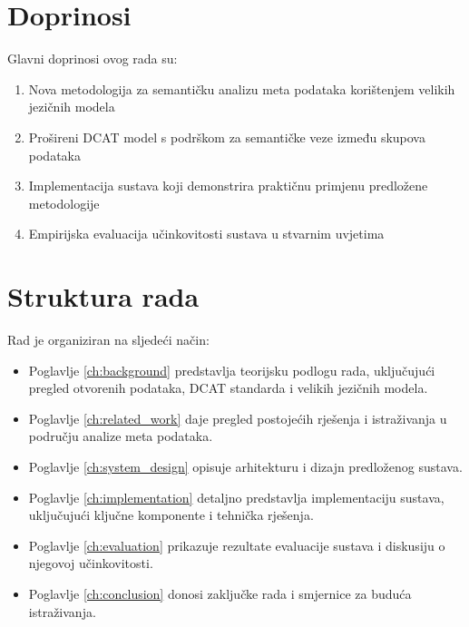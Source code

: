 \section{Doprinosi}
\label{sec:contributions}

Glavni doprinosi ovog rada su:

\begin{enumerate}
    \item Nova metodologija za semantičku analizu meta podataka korištenjem velikih jezičnih modela
    \item Prošireni DCAT model s podrškom za semantičke veze između skupova podataka
    \item Implementacija sustava koji demonstrira praktičnu primjenu predložene metodologije
    \item Empirijska evaluacija učinkovitosti sustava u stvarnim uvjetima
\end{enumerate}

\section{Struktura rada}
\label{sec:structure}

Rad je organiziran na sljedeći način:

\begin{itemize}
    \item Poglavlje \ref{ch:background} predstavlja teorijsku podlogu rada, uključujući 
    pregled otvorenih podataka, DCAT standarda i velikih jezičnih modela.
    
    \item Poglavlje \ref{ch:related_work} daje pregled postojećih rješenja i 
    istraživanja u području analize meta podataka.
    
    \item Poglavlje \ref{ch:system_design} opisuje arhitekturu i dizajn predloženog 
    sustava.
    
    \item Poglavlje \ref{ch:implementation} detaljno predstavlja implementaciju sustava, 
    uključujući ključne komponente i tehnička rješenja.
    
    \item Poglavlje \ref{ch:evaluation} prikazuje rezultate evaluacije sustava i 
    diskusiju o njegovoj učinkovitosti.
    
    \item Poglavlje \ref{ch:conclusion} donosi zaključke rada i smjernice za buduća 
    istraživanja.
\end{itemize}